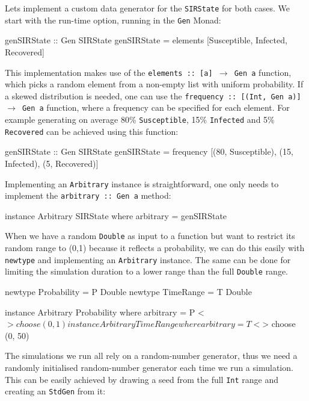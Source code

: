 Lets implement a custom data generator for the \texttt{SIRState} for both cases. We start with the run-time option, running in the \texttt{Gen} Monad:

\begin{HaskellCode}
genSIRState :: Gen SIRState
genSIRState = elements [Susceptible, Infected, Recovered]
\end{HaskellCode}

This implementation makes use of the \texttt{elements :: [a] $\rightarrow$ Gen a} function, which picks a random element from a non-empty list with uniform probability. If a skewed distribution is needed, one can use the \texttt{frequency :: [(Int, Gen a)] $\rightarrow$ Gen a} function, where a frequency can be specified for each element. For example generating on average 80\% \texttt{Susceptible}, 15\% \texttt{Infected} and 5\% \texttt{Recovered} can be achieved using this function:

\begin{HaskellCode}
genSIRState :: Gen SIRState
genSIRState = frequency [(80, Susceptible), (15, Infected), (5, Recovered)]
\end{HaskellCode}

Implementing an \texttt{Arbitrary} instance is straightforward, one only needs to implement the \texttt{arbitrary :: Gen a} method:

\begin{HaskellCode}
instance Arbitrary SIRState where
  arbitrary = genSIRState
\end{HaskellCode}

When we have a random \texttt{Double} as input to a function but want to restrict its random range to (0,1) because it reflects a probability, we can do this easily with \texttt{newtype} and implementing an \texttt{Arbitrary} instance. The same can be done for limiting the simulation duration to a lower range than the full \texttt{Double} range.

\begin{HaskellCode}
newtype Probability = P Double
newtype TimeRange   = T Double

instance Arbitrary Probability where
  arbitrary = P <$> choose (0, 1)
  
instance Arbitrary TimeRange where
  arbitrary = T <$> choose (0, 50)
\end{HaskellCode}

The simulations we run all rely on a random-number generator, thus we need a randomly initialised random-number generator each time we run a simulation. This can be easily achieved by drawing a seed from the full \texttt{Int} range and creating an \texttt{StdGen} from it:

